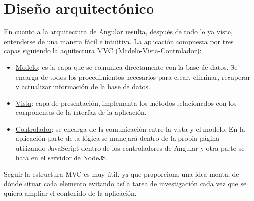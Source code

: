 \section{Diseño arquitectónico}\label{darquitectura}
En cuanto a la arquitectura de Angular resulta, después de todo lo ya visto, entenderse de una manera fácil e intuitiva. La aplicación compuesta por tres capas siguiendo la aquitectura MVC (Modelo-Vista-Controlador):
\begin{itemize}

\item \underline{Modelo}: es la capa que se comunica directamente con la base de datos. Se encarga de todos los procedimientos necesarios para crear, eliminar, recuperar y actualizar información de la base de datos.

\item \underline{Vista}: capa de presentación, implementa los métodos relacionados con los componentes de la interfaz de la aplicación.

 \item \underline{Controlador}: se encarga de la comunicación entre la vista y el modelo. En la aplicación parte de la lógica se manejará dentro de la propia página utilizando JavaScript dentro de los controladores de Angular y otra parte se hará en el servidor de NodeJS.
 


\end{itemize}


Seguir la estructura MVC es muy útil, ya que proporciona una idea mental de dónde situar cada elemento evitando así a tarea de investigación cada vez que se quiera ampliar el contenido de la aplicación.





